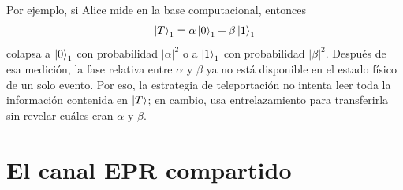 \documentclass[../main.tex]{subfiles}
\begin{document}
Por ejemplo, si Alice mide en la base computacional, entonces
\begin{equation*}
    \ket{T}_1=\alpha\ket{0}_1+\beta\ket{1}_1
\end{equation*}
colapsa a $\ket{0}_1$ con probabilidad $|\alpha|^2$ o a $\ket{1}_1$ con probabilidad $|\beta|^2$. Después de esa medición, la fase relativa entre $\alpha$ y $\beta$ ya no está disponible en el estado físico de un solo evento. Por eso, la estrategia de teleportación no intenta leer toda la información contenida en $\ket{T}$; en cambio, usa entrelazamiento para transferirla sin revelar cuáles eran $\alpha$ y $\beta$.

\section{El canal EPR compartido}
\end{document}
